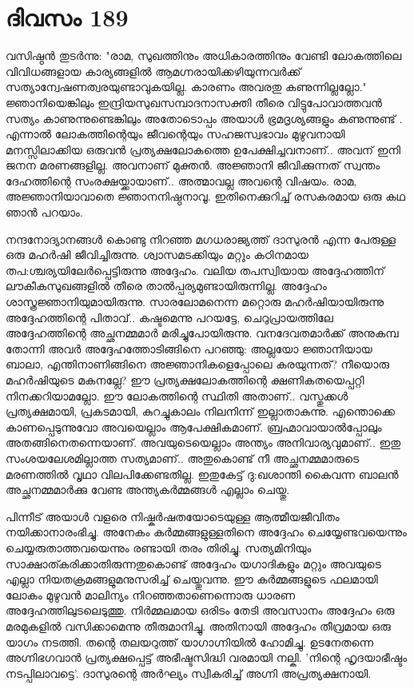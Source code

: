 \section{ദിവസം 189}


വസിഷ്ഠൻ തുടർന്നു: "രാമ, സുഖത്തിനും അധികാരത്തിനും വേണ്ടി ലോകത്തിലെ വിവിധങ്ങളായ കാര്യങ്ങളിൽ ആമഗ്നരായിക്കഴിയുന്നവർക്ക് സത്യാന്വേഷണത്വരയുണ്ടാവുകയില്ല. കാരണം അവരതു കണുന്നില്ലല്ലോ." ജ്ഞാനിയെങ്കിലും ഇന്ദ്രിയസുഖസമ്പാദനാസക്തി തീരെ വിട്ടുപോവാത്തവൻ സത്യം കാണുന്നുണ്ടെങ്കിലും  അതോടൊപ്പം അയാള്‍  ഭ്രമദൃശ്യങ്ങളും കണുന്നുണ്ട് . എന്നാൽ ലോകത്തിന്റെയും ജീവന്റെയും സഹജസ്വഭാവം മുഴുവനായി മനസ്സിലാക്കിയ ഒരുവൻ പ്രത്യക്ഷലോകത്തെ ഉപേക്ഷിച്ചവനാണ്‌.. അവന്‌ ഇനി ജനന മരണങ്ങളില്ല. അവനാണ്‌ മുക്തൻ. അജ്ഞാനി ജീവിക്കുന്നത് സ്വന്തം ദേഹത്തിന്റെ സംരക്ഷയ്ക്കായാണ്‌.. അത്മാവല്ല അവന്റെ വിഷയം. രാമ, അജ്ഞാനിയാവാതെ ജ്ഞാനനിഷ്ഠനാവൂ. ഇതിനെക്കുറിച്ച് രസകരമായ ഒരു കഥ ഞാൻ പറയാം.

നന്ദനോദ്യാനങ്ങൾ കൊണ്ടു നിറഞ്ഞ മഗധരാജ്യത്ത് ദാസുരൻ എന്ന പേരുള്ള ഒരു മഹർഷി ജീവിച്ചിരുന്നു. ശ്വാസമടക്കിയും മറ്റും കഠിനമായ തപ:ശ്ചര്യയിലേർപ്പെട്ടിരുന്നു അദ്ദേഹം. വലിയ തപസ്വിയായ അദ്ദേഹത്തിന്‌ ലൗകീകസുഖങ്ങളിൽ തീരെ താൽപ്പര്യമുണ്ടായിരുന്നില്ല. അദ്ദേഹം ശാസ്ത്രജ്ഞാനിയുമായിരുന്നു. സാരലോമനെന്ന മറ്റൊരു മഹർഷിയായിരുന്നു അദ്ദേഹത്തിന്റെ പിതാവ്‌..  കഷ്ടമെന്നു പറയട്ടേ, ചെറുപ്രായത്തിലേ അദ്ദേഹത്തിന്റെ അച്ഛനമ്മമാർ മരിച്ചുപോയിരുന്നു. വനദേവതമാർക്ക് അനുകമ്പ തോന്നി അവർ അദ്ദേഹത്തോടിങ്ങിനെ പറഞ്ഞു: അല്ലയോ ജ്ഞാനിയായ ബാലാ, എന്തിനാണിങ്ങിനെ അജ്ഞാനികളെപ്പോലെ കരയുന്നത്? നീയൊരു മഹർഷിയുടെ മകനല്ലേ? ഈ പ്രത്യക്ഷലോകത്തിന്റെ ക്ഷണികതയെപ്പറ്റി നിനക്കറിയാമല്ലോ. ഈ ലോകത്തിന്റെ സ്ഥിതി അതാണ്‌.. വസ്തുക്കൾ പ്രത്യക്ഷമായി, പ്രകടമായി, കുറച്ചുകാലം നിലനിന്ന് ഇല്ലാതാകുന്നു. എന്തൊക്കെ കാണപ്പെടുന്നുവോ അവയെല്ലാം ആപേക്ഷികമാണ്‌. ബ്രഹ്മാവായാൽപ്പോലും അതങ്ങിനെതന്നെയാണ്‌. അവയുടെയെല്ലാം അന്ത്യം അനിവാര്യവുമാണ്‌.. ഇതു സംശയലേശമില്ലാത്ത സത്യമാണ്‌.. അതുകൊണ്ട് നീ അച്ഛനമ്മമാരുടെ മരണത്തിൽ വൃഥാ വിലപിക്കേണ്ടതില്ല. ഇതുകേട്ട്  ദു:ഖശാന്തി കൈവന്ന ബാലൻ അച്ഛനമ്മമാര്‍ക്കു വേണ്ട അന്ത്യകർമ്മങ്ങൾ എല്ലാം ചെയ്തു.

പിന്നീട് അയാൾ വളരെ നിഷ്കർഷതയോടെയുള്ള ആത്മീയജീവിതം നയിക്കാനാരംഭിച്ചു. അനേകം കർമ്മങ്ങളുള്ളതിനെ അദ്ദേഹം ചെയ്യേണ്ടവയെന്നും ചെയ്യരുതാത്തവയെന്നും രണ്ടായി തരം തിരിച്ചു. സത്യമിനിയും സാക്ഷാത്കരിക്കാതിരുന്നതുകൊണ്ട് അദ്ദേഹം യഗാദികളും മറ്റും അവയുടെ എല്ലാ നിയതക്രമങ്ങളുമനുസരിച്ച് ചെയ്തുവന്നു. ഈ കർമ്മങ്ങളുടെ ഫലമായി ലോകം മുഴുവൻ മാലിന്യം നിറഞ്ഞതാണെന്നൊരു ധാരണ അദ്ദേഹത്തിലുടലെടുത്തു. നിർമ്മലമായ ഒരിടം തേടി അവസാനം അദ്ദേഹം ഒരു മരമുകളിൽ വസിക്കാമെന്നു തീരുമാനിച്ചു. അതിനായി അദ്ദേഹം തീവ്രമായ ഒരു യാഗം നടത്തി. തന്റെ തലയറുത്ത് യാഗാഗ്നിയിൽ ഹോമിച്ചു. ഉടനേതന്നെ അഗ്നിഭഗവാൻ പ്രത്യക്ഷപ്പെട്ട് അഭീഷ്ടസിദ്ധി വരമായി നല്കി. 'നിന്റെ ഹൃദയാഭീഷ്ടം നടപ്പിലാവട്ടെ'. ദാസുരന്റെ അർഘ്യം സ്വീകരിച്ച് അഗ്നി അപ്രത്യക്ഷനായി. 
